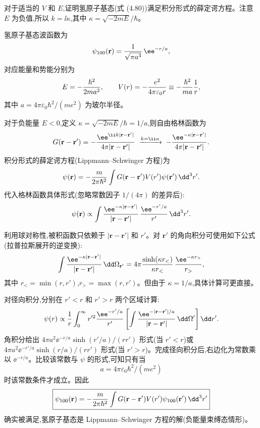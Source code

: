 \begin{question}
对于适当的 $V$ 和 $E$,证明氢原子基态(式 (4.80))满足积分形式的薛定谔方程。注意 $E$ 为负值,所以 $k=\ii\kappa$,其中 $\kappa=\sqrt{-2mE}/\hbar$。

\par\smallskip
{}

\begin{solution}
氢原子基态波函数为
\[
\psi_{100}(\mathbf r)={1\over\sqrt{\pi a^{3}}}\,\ee^{-r/a},
\]
对应能量和势能分别为
\[
E=-{\hbar^2\over2ma^2},\qquad
V(r)=-{e^2\over4\pi\varepsilon_0 r}\equiv-{\hbar^2\over m a}{1\over r},
\]
其中 $a=4\pi\varepsilon_0\hbar^2/(me^2)$ 为玻尔半径。

对于负能量 $E<0$,定义 $\kappa=\sqrt{-2mE}/\hbar=1/a$,则自由格林函数为
\[
G(\mathbf r-\mathbf r')=-{\ee^{\ii k|\mathbf r-\mathbf r'|}\over4\pi|\mathbf r-\mathbf r'|}
\;\xrightarrow{k=\ii\kappa}\;
-{\ee^{-\kappa|\mathbf r-\mathbf r'|}\over4\pi|\mathbf r-\mathbf r'|}.
\]
积分形式的薛定谔方程(Lippmann--Schwinger 方程)为
\[
\psi(\mathbf r)=-{m\over2\pi\hbar^2}\int G(\mathbf r-\mathbf r')V(r')\psi(\mathbf r')\,\dd^3r'.
\]
代入格林函数具体形式(忽略常数因子 $1/(4\pi)$ 的差异后):
\[
\psi(\mathbf r)\propto\int{\ee^{-\kappa|\mathbf r-\mathbf r'|}\over|\mathbf r-\mathbf r'|}\,{\ee^{-r'/a}\over r'}\,\dd^3r'.
\]

利用球对称性,被积函数只依赖于 $|\mathbf r-\mathbf r'|$ 和 $r'$。对 $\mathbf r'$ 的角向积分可使用如下公式(拉普拉斯展开的逆变换):
\[
\int {\ee^{-\kappa|\mathbf r-\mathbf r'|}\over|\mathbf r-\mathbf r'|}\,\dd\Omega_{\mathbf r'}
=4\pi{\sinh(\kappa r_<)\over\kappa r_<}\,{\ee^{-\kappa r_>}\over r_>},
\]
其中 $r_<=\min(r,r')$,$r_>=\max(r,r')$。但由于 $\kappa=1/a$,具体计算可更直接。

对径向积分,分别在 $r'<r$ 和 $r'>r$ 两个区域计算:
\[
\psi(r)\propto{1\over r}\int_0^\infty r'^2{\ee^{-r'/a}\over r'}\left[\int {\ee^{-|\mathbf r-\mathbf r'|/a}\over|\mathbf r-\mathbf r'|}\,\dd\Omega'\right]\dd r'.
\]
角积分给出 $4\pi a^2 \ee^{-r/a}\sinh(r'/a)/(rr')$ 形式(当 $r'<r$)或 $4\pi a^2 \ee^{-r'/a}\sinh(r/a)/(rr')$ 形式(当 $r'>r$)。完成径向积分后,右边化为常数乘以 $\ee^{-r/a}$。比较该常数与 $\psi$ 的形式,可知只有当
\[
a=4\pi\varepsilon_0\hbar^2/(me^2)
\]
时该常数条件才成立。因此
\[
\boxed{\psi_{100}(\mathbf r)=-{m\over2\pi\hbar^2}\int G(\mathbf r-\mathbf r')V(r')\psi_{100}(\mathbf r')\,\dd^3r'}
\]
确实被满足,氢原子基态是 Lippmann--Schwinger 方程的解(负能量束缚态情形)。
\end{solution}
\end{question}

